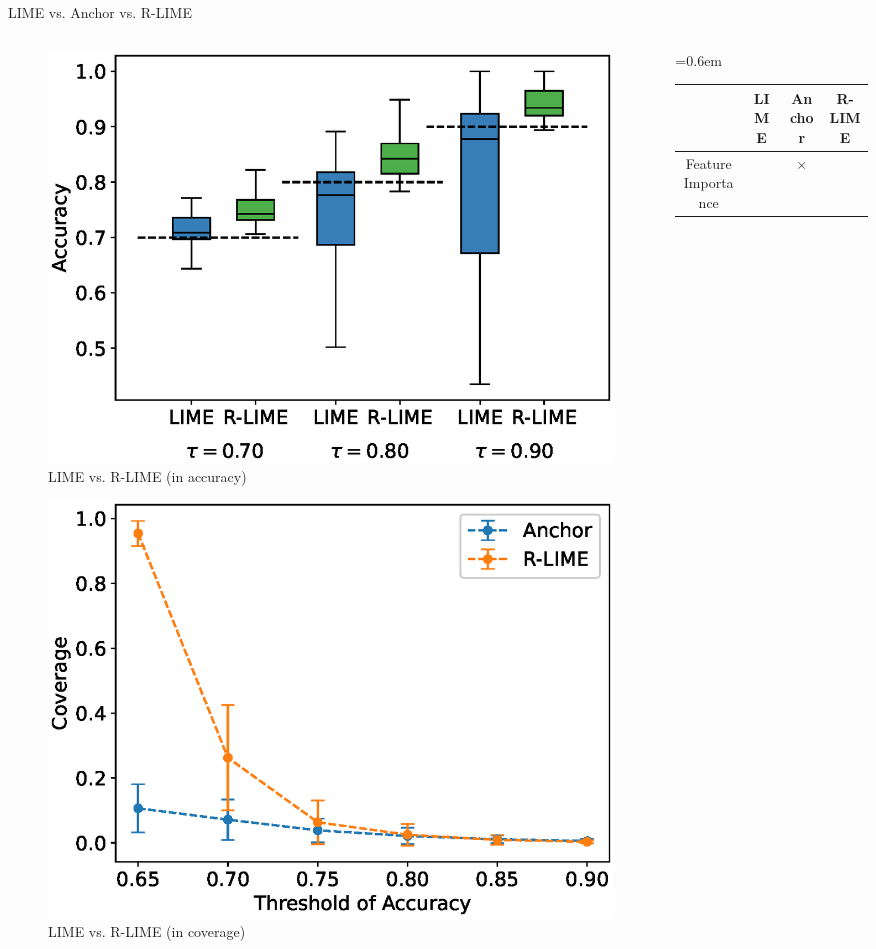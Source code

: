 \documentclass[unicode]{beamer}
\begin{document}
\begin{frame}
\begin{columns}[t]
\begin{column}{.97\linewidth}
\begin{block}{LIME vs. Anchor vs. R-LIME}
\begin{columns}
\begin{column}{\ccol\textwidth}
\begin{figure}
							\includegraphics[width=.83\textwidth]{src/experiments/exp2/box_plot}
							\vspace{-1.0em}
							\caption{LIME vs. R-LIME (in accuracy)}
						\end{figure}
						\begin{figure}
							\includegraphics[width=.83\textwidth]{src/experiments/exp2/comp_cov}
							\vspace{-1.0em}
							\caption{LIME vs. R-LIME (in coverage)}
						\end{figure}
					\end{column}
					\vrule{}
					\begin{column}{\rcol\textwidth}
						\renewcommand{\arraystretch}{1.3}
						\tabcolsep=0.6em
						\begin{center}
							\begin{tabular}{cccc}
								                    & LIME         & Anchor       & \textbf{R-LIME} \\
								\midrule
								Feature Importance  & \checkmark{} & $\times$     & \checkmark{}    \\

\end{tabular}
\end{center}
\end{column}
\end{columns}
\end{block}
\end{column}
\end{columns}
\end{frame}
\end{document}
